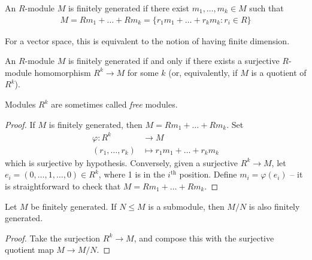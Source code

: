 \documentclass{../../template/note}
\begin{document}
    \begin{definition}
        An $R$-module $M$ is finitely generated if there exist $m_1, \dots, m_k \in M$ such that
        \begin{align*}
            M = Rm_1 + \dots + Rm_k = \{r_1m_1 + \dots + r_km_k: r_i \in R\}
        \end{align*}
    \end{definition}
    
    \begin{remark*}
        For a vector space, this is equivalent to the notion of having finite dimension.
    \end{remark*}
    
    \begin{lemma}
        An $R$-module $M$ is finitely generated if and only if there exists a surjective $R$-module homomorphism $R^k \to M$ for some $k$ (or, equivalently, if $M$ is a quotient of $R^k$).
    \end{lemma}

    \begin{remark*}
        Modules $R^k$ are sometimes called \emph{free} modules.
    \end{remark*}
    
    \begin{proof}
        If $M$ is finitely generated, then $M = Rm_1 + \dots + Rm_k$. Set
        \begin{align*}
            \varphi: R^k &\to M \\
            (r_1, \dots, r_k) &\mapsto r_1m_1 + \dots + r_km_k
        \end{align*}
        which is surjective by hypothesis. Conversely, given a surjective $R^k \to M$, let $e_i = (0, \dots, 1, \dots, 0) \in R^k$, where 1 is in the $i^\text{th}$ position. Define $m_i = \varphi(e_i)$ -- it is straightforward to check that $M = Rm_1 + \dots + Rm_k$.        
    \end{proof}
    
    \begin{corollary}
        Let $M$ be finitely generated. If $N \leq M$ is a submodule, then $M/N$ is also finitely generated.
    \end{corollary}
    
    \begin{proof}
        Take the surjection $R^k \to M$, and compose this with the surjective quotient map $M \to M/N$.
    \end{proof}
    
\end{document}
